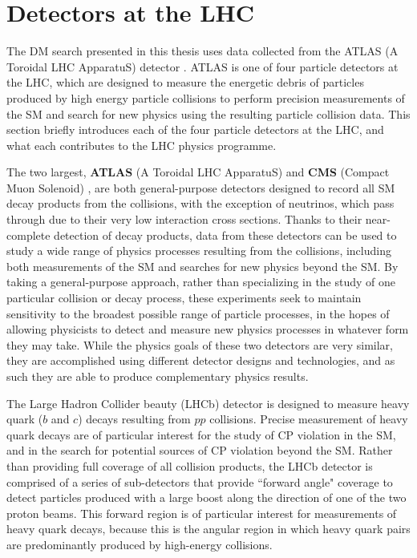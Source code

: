 \section{Detectors at the LHC}

The DM search presented in this thesis uses data collected from the ATLAS (A Toroidal LHC ApparatuS) detector \cite{atlas}. ATLAS is one of four particle detectors at the LHC, which are designed to measure the energetic debris of particles produced by high energy particle collisions to perform precision measurements of the SM and search for new physics using the resulting particle collision data. This section briefly introduces each of the four particle detectors at the LHC, and what each contributes to the LHC physics programme.

The two largest, \textbf{ATLAS} (A Toroidal LHC ApparatuS) \cite{atlas} and \textbf{CMS} (Compact Muon Solenoid) \cite{cms}, are both general-purpose detectors designed to record all SM decay products from the collisions, with the exception of neutrinos, which pass through due to their very low interaction cross sections. Thanks to their near-complete detection of decay products, data from these detectors can be used to study a wide range of physics processes resulting from the collisions, including both measurements of the SM and searches for new physics beyond the SM. By taking a general-purpose approach, rather than specializing in the study of one particular collision or decay process, these experiments seek to maintain sensitivity to the broadest possible range of particle processes, in the hopes of allowing physicists to detect and measure new physics processes in whatever form they may take. While the physics goals of these two detectors are very similar, they are accomplished using different detector designs and technologies, and as such they are able to produce complementary physics results.

The Large Hadron Collider beauty (LHCb) detector \cite{LHCb} is designed to measure heavy quark (\(b\) and \(c\)) decays resulting from \(pp\) collisions. Precise measurement of heavy quark decays are of particular interest for the study of CP violation in the SM, and in the search for potential sources of CP violation beyond the SM. Rather than providing full coverage of all collision products, the LHCb detector is comprised of a series of sub-detectors that provide ``forward angle" coverage to detect particles produced with a large boost along the direction of one of the two proton beams. This forward region is of particular interest for measurements of heavy quark decays, because this is the angular region in which heavy quark pairs are predominantly produced by high-energy collisions.

